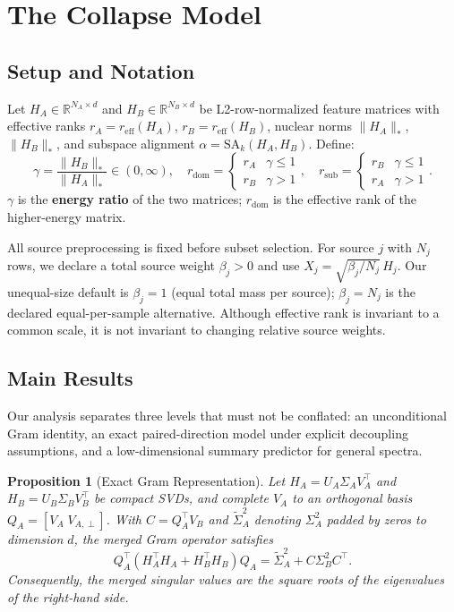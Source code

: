 \documentclass{article}
\newcommand{\reff}{\ensuremath{r_{\mathrm{eff}}}\xspace}
\newcommand{\SAk}{\ensuremath{\mathrm{SA}_k}\xspace}
\newcommand{\R}{\ensuremath{\mathbb{R}}}
\newtheorem{proposition}[lemma]{Proposition}
\begin{document}
\section{The Collapse Model}
\label{sec:method}

\subsection{Setup and Notation}
\label{sec:setup}

Let $H_A\in\R^{N_A\times d}$ and $H_B\in\R^{N_B\times d}$ be L2-row-normalized feature matrices
with effective ranks $r_A=\reff(H_A)$, $r_B=\reff(H_B)$,
nuclear norms $\|H_A\|_*$, $\|H_B\|_*$, and subspace alignment $\alpha=\SAk(H_A,H_B)$.
Define:
\begin{equation}
  \gamma = \frac{\|H_B\|_*}{\|H_A\|_*} \in (0,\infty),
  \quad
  r_{\mathrm{dom}} = \begin{cases}r_A & \gamma\leq1 \\ r_B & \gamma>1\end{cases},
  \quad
  r_{\mathrm{sub}} = \begin{cases}r_B & \gamma\leq1 \\ r_A & \gamma>1\end{cases}.
\end{equation}
$\gamma$ is the \textbf{energy ratio} of the two matrices;
$r_{\mathrm{dom}}$ is the effective rank of the higher-energy matrix.

All source preprocessing is fixed before subset selection.  For source $j$
with $N_j$ rows, we declare a total source weight $\beta_j>0$ and use
$X_j=\sqrt{\beta_j/N_j}\,H_j$.  Our unequal-size default is $\beta_j=1$
(equal total mass per source); $\beta_j=N_j$ is the declared equal-per-sample
alternative.  Although effective rank is invariant to a common scale, it is
not invariant to changing relative source weights.

\subsection{Main Results}
\label{sec:theorem}

Our analysis separates three levels that must not be conflated:
an unconditional Gram identity, an exact paired-direction model under
explicit decoupling assumptions, and a low-dimensional summary predictor
for general spectra.

\begin{proposition}[Exact Gram Representation]
\label{prop:gram_general}
Let $H_A=U_A\Sigma_A V_A^\top$ and
$H_B=U_B\Sigma_B V_B^\top$ be compact SVDs, and complete $V_A$ to an
orthogonal basis $Q_A=[V_A\;V_{A,\perp}]$.  With
$C=Q_A^\top V_B$ and $\widetilde\Sigma_A^2$ denoting $\Sigma_A^2$
padded by zeros to dimension $d$, the merged Gram operator satisfies
\begin{equation}
 Q_A^\top(H_A^\top H_A+H_B^\top H_B)Q_A
 =\widetilde\Sigma_A^2+C\Sigma_B^2C^\top.
 \label{eq:general_gram}
\end{equation}
Consequently, the merged singular values are the square roots of the
eigenvalues of the right-hand side.
\end{proposition}
\end{document}

